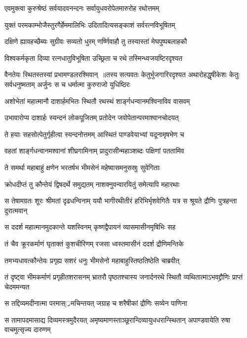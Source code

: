 \twolineshloka
{एवमुक्त्वा कुरुश्रेष्ठं सर्वयादवनन्दनः}
{सर्वायुधवरोपेतमारुरोह रथोत्तमम्}


\twolineshloka
{युक्तं परमकाम्भोजैस्तुरगैर्हेममालिभिः}
{उदितादित्यसङ्काशं सर्वरत्नविभूषितम्}


\twolineshloka
{दक्षिणे ह्यावहच्छैब्यः सुग्रीवः सव्यतो धुरम्}
{णर्ष्णिवाहौ तु तस्यास्तां मेघपुष्पबलाहकौ}


\twolineshloka
{विश्वकर्मकृता दिव्या रत्नधातुविभूषिता}
{उच्छ्रिता च रथे तस्मिन्ध्वजयष्टिरदृश्यत}


वैनतेयः स्थितस्तस्यां प्रभामण्डलरश्मिवान् ॥तस्य सत्यवतः केतुर्भुजगारिरदृश्यत
\twolineshloka
{अथारोहद्धृषीकेशः केतुः सर्वधनुष्मताम्}
{अर्जुनः स च धर्मात्मा कुरुराजो युधिष्ठिरः}


\twolineshloka
{अशोभेतां महात्मानौ दाशार्हमभितः स्थितौ}
{रथस्थं शार्ङ्गधन्वानमश्विनाविव वासवम्}


\twolineshloka
{उभावारोप्य दाशार्हः स्यन्दनं लोकपूजितम्}
{प्रतोदेन जवोपेतान्परमाश्वानचोदयत्}


\twolineshloka
{ते हयाः सहसोत्पेतुर्गृहीत्वा स्यन्दनोत्तमम्}
{आस्थितं पाण्डवेयाभ्यां यदूनामृषभेण च}


\twolineshloka
{वहतां शार्ङ्गधन्वानमश्वानां शीघ्रगामिनाम्}
{प्रादुरासीन्महाञ्शब्दः पक्षिणां पततामिव}


\twolineshloka
{ते समर्था महाबाहुं क्षणेन भरतर्षभ}
{भीमसेनं महेष्वासमनुसस्रुः सुवेगिताः}


\twolineshloka
{क्रोधदीप्तं तु कौन्तेयं द्विषदर्थे समुद्यतम्}
{नाशक्नुवन्वारयितुं समेत्यापि महारथाः}


\threelineshloka
{स तेषामग्रतः शूरः श्रीमतां दृढधन्विनाम्}
{ययौ भागीरथीतीरं हरिभिर्भृशवेगितैः}
{यत्र स श्रूयते द्रौणिः पुत्रहन्ता दुरात्मवान्}


\twolineshloka
{स ददर्श महात्मानमुदकान्ते यशस्विनम्}
{कृष्णद्वैपायनं व्यासमासीनमृषिभिः सह}


\twolineshloka
{तं चैव क्रूरकर्माणं घृताक्तं कुशचीरिणम्}
{रजसा ध्वस्तमासीनं ददर्श द्रौणिमन्तिके}


\twolineshloka
{तमभ्यधावत्कौन्तेयः प्रगृह्य सशरं धनुः}
{भीमसेनो महाबाहुस्तिष्ठतिष्ठेति चाब्रवीत्}


\threelineshloka
{तं दृष्ट्वा भीमकर्माणं प्रगृहीतशरासनम्}
{भ्रातरौ पृष्ठतश्चास्य जनार्दनरथे स्थितौ}
{व्यथितात्माऽभवद्द्रौणिः प्राप्तं चेदममन्यत}


\twolineshloka
{स तद्दिव्यमदीनात्मा परमास््रमचिन्तयत्}
{जग्राह च शरैषीकां द्रौणिः सव्येन पाणिना}


\threelineshloka
{स तामापदमासाद्य दिव्यमस्त्रमुदैरयत्}
{अमृष्यमाणस्ताञ्छूरान्दिव्यायुधधरान्स्थितान्}
{अपाण्डवायेति रुषा वाचमुत्सृज्य दारुणम्}


